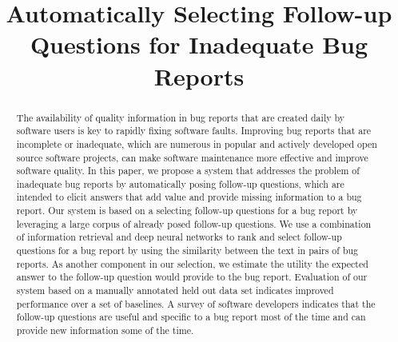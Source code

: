 \documentclass[10pt,conference]{IEEEtran}
\begin{document}
\title{Automatically Selecting Follow-up Questions for Inadequate Bug Reports}

\author{
\and
{}
\and
{}
}

\maketitle

\begin{abstract}
The availability of quality information in bug reports that are created daily by software users is key
to rapidly fixing software faults.
%
%
Improving bug reports that are incomplete or inadequate, which are numerous in popular and actively developed open source software projects, can make software maintenance more effective and improve software quality.
%
In this paper, we propose a system that addresses the problem of inadequate bug reports by automatically posing follow-up questions,
which are intended to elicit answers that add value and provide missing information to a bug report.
%
Our system is based on a selecting follow-up questions for a bug report by leveraging a large corpus of already posed follow-up questions.
%
We use a combination of information retrieval and deep neural networks to rank and select
follow-up questions for a bug report by using the similarity between the text in pairs of bug
reports.
%
As another component in our selection, we estimate the utility the expected answer to the follow-up question would provide
to the bug report.
%
Evaluation of our system based on a manually annotated held out data set indicates improved
performance over a set of baselines.
%
A survey of software developers indicates that the follow-up questions are useful and specific to a bug
report most of the time and can provide new information some of the time.

\end{abstract}
\end{document}
